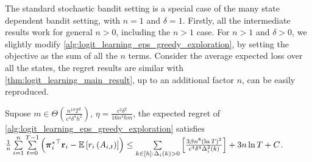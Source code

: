 The standard stochastic bandit setting is a special case of the many state dependent bandit setting, with $n = 1$ and $\delta = 1$. Firstly, all the intermediate results work for general $n > 0$, including the $n > 1$ case.
For $n > 1$ and $\delta > 0$, we slightly modify \cref{alg:logit_learning_eps_greedy_exploration}, by setting the objective as the sum of all the $n$ terms. Consider the average expected loss over all the states, the regret results are similar with \cref{thm:logit_learning_main_result}, up to an additional factor $n$, can be easily reproduced.
\begin{thm}
\label{thm:many_state_dependent_bandit_setting}
     Supose $m \in \Theta\left( \frac{n^{10} T^2}{c^4 \delta^4 h^2} \right)$, $\eta = \frac{c^2 \delta^2}{16 n^4 h m}$, the expected regret of \cref{alg:logit_learning_eps_greedy_exploration} satisfies $\frac{1}{n } \sum\limits_{i=1}^{n}{ \sum\limits_{t=0}^{T-1}{ \left( {{\boldsymbol{\pi}}_i^*}^\top {\mathbf{r}}_i - {\mathbb{E}} \left[ r_i\left(A_{i,t}\right) \right] \right) } \le \sum\limits_{k \in [h] : \Delta_i(k) > 0}{ \left[ \frac{ 3 \beta n^8 \left( \ln{T} \right)^2}{c^4 \delta^4 \Delta_i^2(k)} \right] } + 3 n \ln{T} + C }$.
\end{thm}


